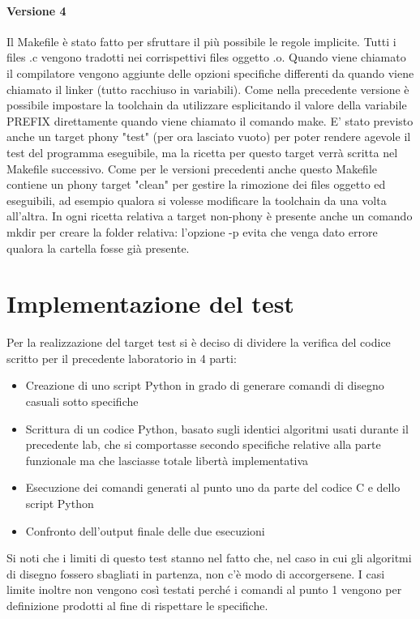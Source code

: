 \documentclass{article}
\begin{document}
		\paragraph*{Versione 4}
			Il Makefile è stato fatto per sfruttare il più possibile le regole implicite. Tutti i files .c vengono tradotti
			nei corrispettivi files oggetto .o.
			Quando viene chiamato il compilatore vengono aggiunte delle opzioni specifiche differenti da quando viene chiamato
			il linker (tutto racchiuso in variabili).
			Come nella precedente versione è possibile impostare la toolchain da utilizzare esplicitando il valore della
			variabile PREFIX direttamente quando viene chiamato il comando make.
			E' stato previsto anche un target phony "test" (per ora lasciato vuoto) per poter rendere agevole il test
			del programma eseguibile, ma la ricetta per questo target verrà scritta nel Makefile successivo.
			Come per le versioni precedenti anche questo Makefile contiene un phony target "clean" per gestire la rimozione
			dei files oggetto ed eseguibili, ad esempio qualora si volesse modificare la toolchain da una volta
			all'altra.
			In ogni ricetta relativa a target non-phony è presente anche un comando mkdir per creare la folder relativa:
			l'opzione -p evita che venga dato errore qualora la cartella fosse già presente.
\section{Implementazione del test}
	Per la realizzazione del target test si è deciso di dividere la verifica del codice scritto per il precedente laboratorio 
	in 4 parti:
	\begin{itemize}
		\item Creazione di uno script Python in grado di generare comandi di disegno casuali sotto specifiche
		\item Scrittura di un codice Python, basato sugli identici algoritmi usati durante il precedente lab, che si comportasse secondo specifiche relative alla parte funzionale ma che lasciasse totale libertà implementativa
		\item Esecuzione dei comandi generati al punto uno da parte del codice C e dello script Python
		\item Confronto dell'output finale delle due esecuzioni
	\end{itemize}
	Si noti che i limiti di questo test stanno nel fatto che, nel caso in cui gli algoritmi di disegno fossero sbagliati in 
	partenza, non c'è modo di accorgersene. I casi limite inoltre non vengono così testati perché i comandi al punto 1 vengono 
	per definizione prodotti al fine di rispettare le specifiche.
	
\end{document}
